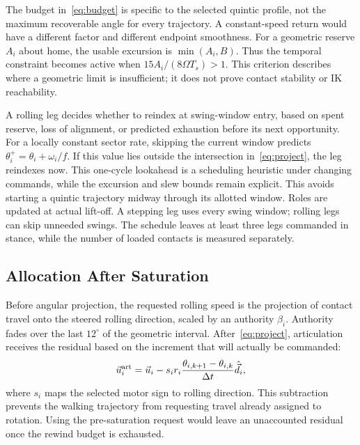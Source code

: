 \documentclass[letterpaper,10pt,conference]{ieeeconf}
\newcommand{\vct}[1]{\vec{#1}}
\begin{document}
The budget in~\eqref{eq:budget} is specific to the selected quintic profile, not the maximum recoverable angle for every trajectory. A constant-speed return would have a different factor and different endpoint smoothness. For a geometric reserve $A_i$ about home, the usable excursion is $\min(A_i,B)$. Thus the temporal constraint becomes active when $15A_i/(8\Omega T_s)>1$. This criterion describes where a geometric limit is insufficient; it does not prove contact stability or IK reachability.

A rolling leg decides whether to reindex at swing-window entry, based on spent reserve, loss of alignment, or predicted exhaustion before its next opportunity. For a locally constant sector rate, skipping the current window predicts $\theta_i^+=\theta_i+\omega_i/f$. If this value lies outside the intersection in~\eqref{eq:project}, the leg reindexes now. This one-cycle lookahead is a scheduling heuristic under changing commands, while the excursion and slew bounds remain explicit. This avoids starting a quintic trajectory midway through its allotted window. Roles are updated at actual lift-off. A stepping leg uses every swing window; rolling legs can skip unneeded swings. The schedule leaves at least three legs commanded in stance, while the number of loaded contacts is measured separately.

\subsection{Allocation After Saturation}
Before angular projection, the requested rolling speed is the projection of contact travel onto the steered rolling direction, scaled by an authority $\beta_i$. Authority fades over the last $12^\circ$ of the geometric interval. After~\eqref{eq:project}, articulation receives the residual based on the increment that will actually be commanded:
\begin{equation}
 \vct{u}^{\rm art}_i=\vct{u}_i-
 s_i r_i\frac{\theta_{i,k+1}-\theta_{i,k}}{\Delta t}\hat{\vct{d}}_i,\label{eq:residual}
\end{equation}
where $s_i$ maps the selected motor sign to rolling direction. This subtraction prevents the walking trajectory from requesting travel already assigned to rotation. Using the pre-saturation request would leave an unaccounted residual once the rewind budget is exhausted.
\end{document}
